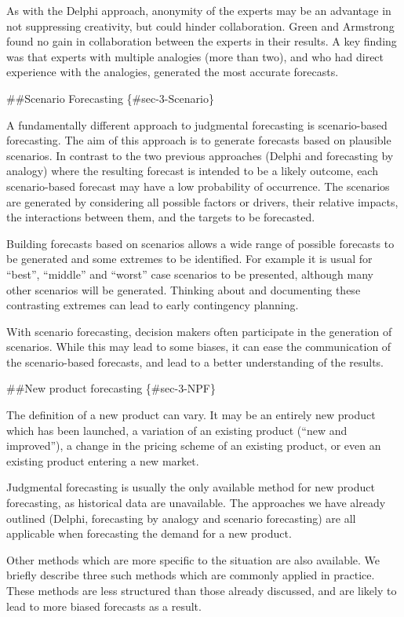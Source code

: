 \documentclass[]{book}
\begin{document}
As with the Delphi approach, anonymity of the experts may be an advantage in not suppressing creativity, but could hinder collaboration. Green and Armstrong found no gain in collaboration between the experts in their results. A key finding was that experts with multiple analogies (more than two), and who had direct experience with the analogies, generated the most accurate forecasts.

\#\#Scenario Forecasting \{\#sec-3-Scenario\}

A fundamentally different approach to judgmental forecasting is scenario-based forecasting. The aim of this approach is to generate forecasts based on plausible scenarios. In contrast to the two previous approaches (Delphi and forecasting by analogy) where the resulting forecast is intended to be a likely outcome, each scenario-based forecast may have a low probability of occurrence. The scenarios are generated by considering all possible factors or drivers, their relative impacts, the interactions between them, and the targets to be forecasted.

Building forecasts based on scenarios allows a wide range of possible forecasts to be generated and some extremes to be identified. For example it is usual for ``best'', ``middle'' and ``worst'' case scenarios to be presented, although many other scenarios will be generated. Thinking about and documenting these contrasting extremes can lead to early contingency planning.

With scenario forecasting, decision makers often participate in the generation of scenarios. While this may lead to some biases, it can ease the communication of the scenario-based forecasts, and lead to a better understanding of the results.

\#\#New product forecasting \{\#sec-3-NPF\}

The definition of a new product can vary. It may be an entirely new product which has been launched, a variation of an existing product (``new and improved''), a change in the pricing scheme of an existing product, or even an existing product entering a new market.

Judgmental forecasting is usually the only available method for new product forecasting, as historical data are unavailable. The approaches we have already outlined (Delphi, forecasting by analogy and scenario forecasting) are all applicable when forecasting the demand for a new product.

Other methods which are more specific to the situation are also available. We briefly describe three such methods which are commonly applied in practice. These methods are less structured than those already discussed, and are likely to lead to more biased forecasts as a result.
\end{document}
